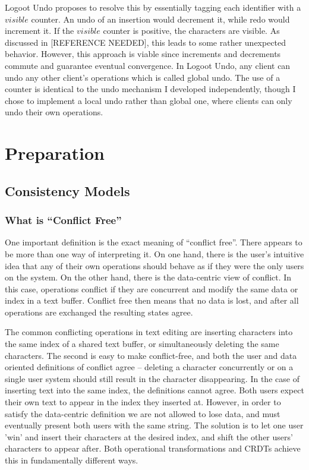 \documentclass[12pt,a4paper,twoside,openright]{report}
\begin{document}
Logoot Undo \cite{weiss2010undo} proposes to resolve this by essentially tagging each identifier with a $visible$ counter. An undo of an insertion would decrement it, while redo would increment it. If the $visible$ counter is positive, the characters are visible. As discussed in [REFERENCE NEEDED], this leads to some rather unexpected behavior. However, this approach is viable since increments and decrements commute and guarantee eventual convergence. In Logoot Undo, any client can undo any other client's operations which is called global undo. The use of a counter is identical to the undo mechanism I developed independently, though I chose to implement a local undo rather than global one, where clients can only undo their own operations.


\chapter{Preparation}


\section{Consistency Models}

	\subsection{What is ``Conflict Free''}
	
	One important definition is the exact meaning of ``conflict free''. There appears to be more than one way of interpreting it. On one hand, there is the user's intuitive idea that any of their own operations should behave as if they were the only users on the system. On the other hand, there is the data-centric view of conflict. In this case, operations conflict if they are concurrent and modify the same data or index in a text buffer. Conflict free then means that no data is lost, and after all operations are exchanged the resulting states agree.
	
	The common conflicting operations in text editing are inserting characters into the same index of a shared text buffer, or simultaneously deleting the same characters. The second is easy to make conflict-free, and both the user and data oriented definitions of conflict agree -- deleting a character concurrently or on a single user system should still result in the character disappearing. In the case of inserting text into the same index, the definitions cannot agree. Both users expect their own text to appear in the index they inserted at. However, in order to satisfy the data-centric definition we are not allowed to lose data, and must eventually present both users with the same string. The solution is to let one user 'win' and insert their characters at the desired index, and shift the other users' characters to appear after. Both operational transformations and CRDTs achieve this in fundamentally different ways.
	
\end{document}
